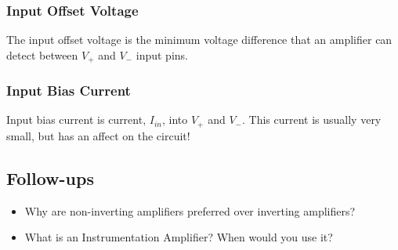 \documentclass[main.tex]{subfiles}
\begin{document}
\subsubsection{Input Offset Voltage}
The input offset voltage is the minimum voltage difference that an amplifier can detect between $V_{+}$ and $V_{-}$ input pins. 

\subsubsection{Input Bias Current}
Input bias current is current, $I_{in}$, into $V_{+}$ and $V_{-}$. This current is usually very small, but has an affect on the circuit! 

\subsection{Follow-ups}
\begin{itemize}
    \item Why are non-inverting amplifiers preferred over inverting amplifiers? %
    \item What is an Instrumentation Amplifier? When would you use it? %
\end{itemize}
\end{document}
